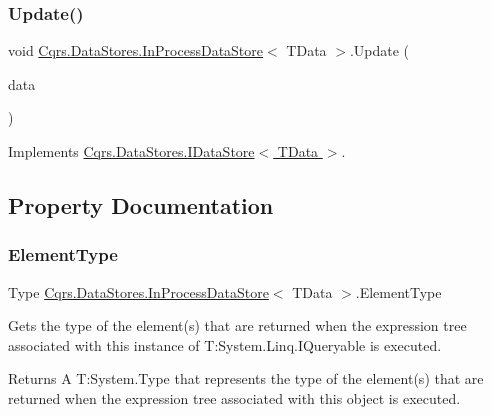 \subsubsection{\texorpdfstring{Update()}{Update()}}
{\footnotesize\ttfamily void \hyperlink{classCqrs_1_1DataStores_1_1InProcessDataStore}{Cqrs.\+Data\+Stores.\+In\+Process\+Data\+Store}$<$ T\+Data $>$.Update (\begin{DoxyParamCaption}\item[{T\+Data}]{data }\end{DoxyParamCaption})}



Implements \hyperlink{interfaceCqrs_1_1DataStores_1_1IDataStore_a6d5d4dd572de8db01ff0c48d37faefa7}{Cqrs.\+Data\+Stores.\+I\+Data\+Store$<$ T\+Data $>$}.



\subsection{Property Documentation}
\mbox{\label{classCqrs_1_1DataStores_1_1InProcessDataStore_aacc8434efa0250be78dda57e159a5aa8}} 
\subsubsection{\texorpdfstring{Element\+Type}{ElementType}}
{\footnotesize\ttfamily Type \hyperlink{classCqrs_1_1DataStores_1_1InProcessDataStore}{Cqrs.\+Data\+Stores.\+In\+Process\+Data\+Store}$<$ T\+Data $>$.Element\+Type\hspace{0.3cm}{\ttfamily [get]}}



Gets the type of the element(s) that are returned when the expression tree associated with this instance of T\+:\+System.\+Linq.\+I\+Queryable is executed. 

\begin{DoxyReturn}{Returns}
A T\+:\+System.\+Type that represents the type of the element(s) that are returned when the expression tree associated with this object is executed. 
\end{DoxyReturn}
\mbox{\label{classCqrs_1_1DataStores_1_1InProcessDataStore_a459174c411a0df2b4ec1e48a3b36f884}} 
